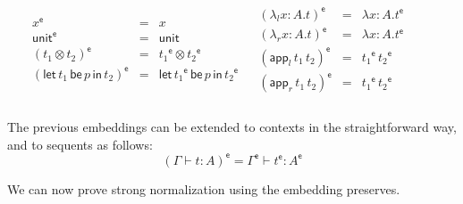 \documentclass{llncs}
\newcommand{\Lnt}[1]{\mathit{#1}}
\newcommand{\Lmv}[1]{\mathit{#1}}
\newcommand{\Lsym}[1]{#1}
\begin{document}
\begin{definition}
\begin{center}
\begin{math}
\begin{array}{lll}
\begin{array}{lll}
        & \begin{array}{rll}
             \Lmv{x} ^{\mathsf{e} }  & = & \Lmv{x}\\
              \mathsf{unit}  ^{\mathsf{e} }  & = &  \mathsf{unit} \\
              (   \Lnt{t_{{\mathrm{1}}}}  \otimes  \Lnt{t_{{\mathrm{2}}}}   )  ^{\mathsf{e} }  & = &   \Lnt{t_{{\mathrm{1}}}} ^{\mathsf{e} }   \otimes    \Lnt{t_{{\mathrm{2}}}} ^{\mathsf{e} }   \\
              (   \mathsf{let}\, \Lnt{t_{{\mathrm{1}}}} \,\mathsf{be}\, \Lnt{p} \,\mathsf{in}\, \Lnt{t_{{\mathrm{2}}}}   )  ^{\mathsf{e} }  & = &  \mathsf{let}\,  \Lnt{t_{{\mathrm{1}}}} ^{\mathsf{e} }  \,\mathsf{be}\, \Lnt{p} \,\mathsf{in}\,   \Lnt{t_{{\mathrm{2}}}} ^{\mathsf{e} }   \\
          \end{array}
        & \begin{array}{rll}
              (   \lambda_l  \Lmv{x} : \Lnt{A} . \Lnt{t}   )  ^{\mathsf{e} }  & = &  \lambda  \Lmv{x} : \Lnt{A} .   \Lnt{t} ^{\mathsf{e} }   \\
              (   \lambda_r  \Lmv{x} : \Lnt{A} . \Lnt{t}   )  ^{\mathsf{e} }  & = &  \lambda  \Lmv{x} : \Lnt{A} .   \Lnt{t} ^{\mathsf{e} }   \\
              (   \mathsf{app}_l\, \Lnt{t_{{\mathrm{1}}}} \, \Lnt{t_{{\mathrm{2}}}}   )  ^{\mathsf{e} }  & = &    \Lnt{t_{{\mathrm{1}}}} ^{\mathsf{e} }   \,   \Lnt{t_{{\mathrm{2}}}} ^{\mathsf{e} }   \\
              (   \mathsf{app}_r\, \Lnt{t_{{\mathrm{1}}}} \, \Lnt{t_{{\mathrm{2}}}}   )  ^{\mathsf{e} }  & = &    \Lnt{t_{{\mathrm{1}}}} ^{\mathsf{e} }   \,   \Lnt{t_{{\mathrm{2}}}} ^{\mathsf{e} }   \\
          \end{array}
      \end{array}
      \end{array}
    \end{math}
  \end{center}
  The previous embeddings can be extended to contexts in the
  straightforward way, and to sequents as follows:
  \[  \Lsym{(}   \Gamma  \vdash  \Lnt{t}  :  \Lnt{A}   \Lsym{)} ^{\mathsf{e} }  =   \Gamma ^{\mathsf{e} }   \vdash   \Lnt{t} ^{\mathsf{e} }   :    \Lnt{A} ^{\mathsf{e} }   \]
\end{definition}
\noindent
We can now prove strong normalization using the embedding preserves.
\end{document}
